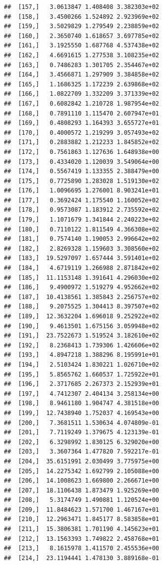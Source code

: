 \documentclass[article]{jss}\usepackage[]{graphicx}\usepackage[]{xcolor}
\makeatletter
\newenvironment{kframe}{%
 \def\at@end@of@kframe{}%
 \ifinner\ifhmode%
  \def\at@end@of@kframe{\end{minipage}}%
  \begin{minipage}{\columnwidth}%
 \fi\fi%
 \def\FrameCommand##1{\hskip\@totalleftmargin \hskip-\fboxsep
 \colorbox{shadecolor}{##1}\hskip-\fboxsep
     \hskip-\linewidth \hskip-\@totalleftmargin \hskip\columnwidth}%
 \MakeFramed {\advance\hsize-\width
   \@totalleftmargin\z@ \linewidth\hsize
   \@setminipage}}%
 {\par\unskip\endMakeFramed%
 \at@end@of@kframe}
\newenvironment{knitrout}{}{} %
\makeatother
\begin{document}
\begin{knitrout}
\begin{kframe}
\begin{verbatim}
##  [157,]   3.0613847 1.408408 3.382303e+02
##  [158,]   3.4500266 1.524892 2.923969e+02
##  [159,]   3.5029829 1.279549 2.238859e+02
##  [160,]   2.3650740 1.618657 3.697785e+02
##  [161,]   3.1925550 1.687768 4.537438e+02
##  [162,]   4.6691615 1.277538 3.108235e+02
##  [163,]   0.7486283 1.301705 2.354467e+02
##  [164,]   3.4566871 1.297909 3.384858e+02
##  [165,]   1.1686325 1.172239 2.639868e+02
##  [166,]   1.0822709 1.332209 3.371339e+02
##  [167,]   0.6082842 1.210728 1.987954e+02
##  [168,]   0.7891110 1.115470 2.607947e+01
##  [169,]   0.4808293 1.164393 3.655727e+01
##  [170,]   0.4000572 1.219299 3.057493e+02
##  [171,]   0.2883882 1.212233 1.845852e+02
##  [172,]   0.7561863 1.127636 1.648938e+00
##  [173,]   0.4334020 1.120039 3.549064e+00
##  [174,]   0.5567419 1.133355 2.388479e+00
##  [175,]   0.7725890 1.283028 1.519130e+02
##  [176,]   1.0096695 1.276001 8.903241e+01
##  [177,]   0.3692424 1.175540 1.160052e+02
##  [178,]   0.9573087 1.183912 2.735592e+02
##  [179,]   1.1071679 1.341844 2.240223e+02
##  [180,]   0.7110122 1.811549 4.366308e+02
##  [181,]   0.7574140 1.190053 2.996642e+02
##  [182,]   2.8269328 1.159603 3.308560e+02
##  [183,]  19.5297097 1.657444 3.591401e+02
##  [184,]   4.6719119 1.266988 2.871842e+02
##  [185,]  11.1153148 1.391641 4.296030e+02
##  [186,]   9.4900972 1.519279 4.952662e+02
##  [187,]  10.4138561 1.385843 2.256757e+02
##  [188,]   9.2075525 1.304413 8.397507e+02
##  [189,]  12.3632204 1.696018 9.252922e+02
##  [190,]   9.4613501 1.675156 3.059948e+02
##  [191,]  23.7522673 1.519524 3.182610e+02
##  [192,]   8.2368413 1.739306 1.426606e+02
##  [193,]   4.8947218 1.388296 8.195991e+01
##  [194,]   2.5103424 1.830221 1.026710e+02
##  [195,]   5.8565762 1.660537 1.725922e+01
##  [196,]   2.3717685 2.267373 2.152939e+01
##  [197,]   4.7412307 2.404134 3.258134e+00
##  [198,]   8.9461180 1.904747 4.381518e+00
##  [199,]  12.7438940 1.752037 4.169543e+00
##  [200,]   7.3681511 1.530634 4.074809e-01
##  [201,]   7.7119249 1.379675 4.123139e-01
##  [202,]   6.3298992 1.830125 6.329020e+00
##  [203,]   3.3607364 1.477820 7.592217e-01
##  [204,]  35.6151991 2.030499 3.775975e+00
##  [205,]  14.2275342 1.692799 2.105088e+00
##  [206,]  14.1008623 1.669800 2.266671e+00
##  [207,]  18.1106438 1.873479 1.925269e+00
##  [208,]   5.3174749 1.490881 1.120524e+00
##  [209,]  11.8484623 1.571700 1.467167e+01
##  [210,]  12.2963471 1.845177 8.583858e+01
##  [211,]  15.3806381 1.701190 4.145623e+01
##  [212,]  13.1563393 1.749822 2.458768e+01
##  [213,]   8.1615978 1.411570 2.455536e+00
##  [214,]  23.1194441 1.478130 3.889168e-01

\end{verbatim}
\end{kframe}
\end{knitrout}
\end{document}
